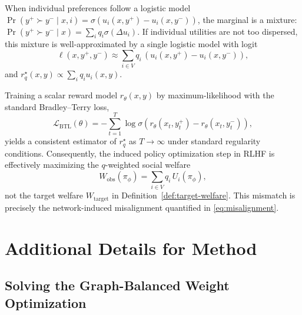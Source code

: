 \documentclass{article}
\theoremstyle{plain}
\theoremstyle{definition}
\theoremstyle{remark}
\begin{document}
When individual preferences follow a logistic model
$\Pr(y^+ \succ y^- \mid x, i) = \sigma(u_i(x,y^+) - u_i(x,y^-))$, the marginal
is a mixture:
$\Pr(y^+ \succ y^- \mid x) = \sum_i q_i \sigma(\Delta u_i)$.
If individual utilities are not too dispersed, this mixture is
well-approximated by a single logistic model with logit
\begin{equation}
    \ell(x, y^+, y^-)
    \approx
    \sum_{i \in V} q_i \,
    \left( u_i(x,y^+) - u_i(x,y^-) \right),
\end{equation}
and $r_q^\star(x,y) \propto \sum_i q_i u_i(x,y)$.

Training a scalar reward model $r_\theta(x,y)$ by maximum-likelihood with the
standard Bradley--Terry loss,
\begin{equation}
    \mathcal{L}_{\text{BTL}}(\theta)
    =
    - \sum_{t=1}^T
    \log \sigma\!\left( r_\theta(x_t, y_t^+) - r_\theta(x_t, y_t^-) \right),
\end{equation}
yields a consistent estimator of $r_q^\star$ as $T \to \infty$ under standard
regularity conditions. Consequently, the induced policy optimization step in
RLHF is effectively maximizing the $q$-weighted social welfare
\begin{equation}
    W_{\text{obs}}(\pi_\phi)
    =
    \sum_{i \in V} q_i \, U_i(\pi_\phi),
\end{equation}
not the target welfare $W_{\text{target}}$ in
Definition~\ref{def:target-welfare}. This mismatch is precisely the
network-induced misalignment quantified in \eqref{eq:misalignment}.

\section{Additional Details for Method}
\label{app:method-details}

\subsection{Solving the Graph-Balanced Weight Optimization}
\label{app:wstar-details}
\end{document}
